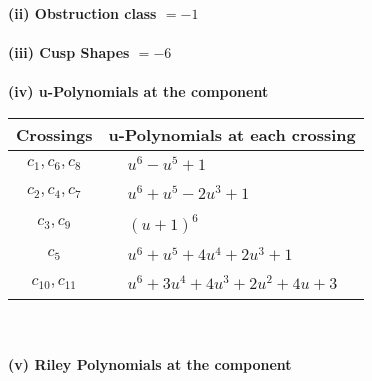 \documentclass[1p]{elsarticle_modified}
\theoremstyle{definition}
\begin{document}
\flushleft \textbf{(ii) Obstruction class $= -1$}\\~\\
\flushleft \textbf{(iii) Cusp Shapes $= -6$}\\~\\
\newpage\renewcommand{\arraystretch}{1}
\flushleft \textbf{(iv) u-Polynomials at the component}\newline \\
\begin{tabular}{m{50pt}|m{274pt}}
Crossings & \hspace{64pt}u-Polynomials at each crossing \\
\hline $$\begin{aligned}c_{1},c_{6},c_{8}\end{aligned}$$&$\begin{aligned}
&u^6- u^5+1
\end{aligned}$\\
\hline $$\begin{aligned}c_{2},c_{4},c_{7}\end{aligned}$$&$\begin{aligned}
&u^6+u^5-2 u^3+1
\end{aligned}$\\
\hline $$\begin{aligned}c_{3},c_{9}\end{aligned}$$&$\begin{aligned}
&(u+1)^6
\end{aligned}$\\
\hline $$\begin{aligned}c_{5}\end{aligned}$$&$\begin{aligned}
&u^6+u^5+4 u^4+2 u^3+1
\end{aligned}$\\
\hline $$\begin{aligned}c_{10},c_{11}\end{aligned}$$&$\begin{aligned}
&u^6+3 u^4+4 u^3+2 u^2+4 u+3
\end{aligned}$\\
\hline
\end{tabular}\\~\\
\newpage\renewcommand{\arraystretch}{1}
\flushleft \textbf{(v) Riley Polynomials at the component}\newline \\
\end{document}
